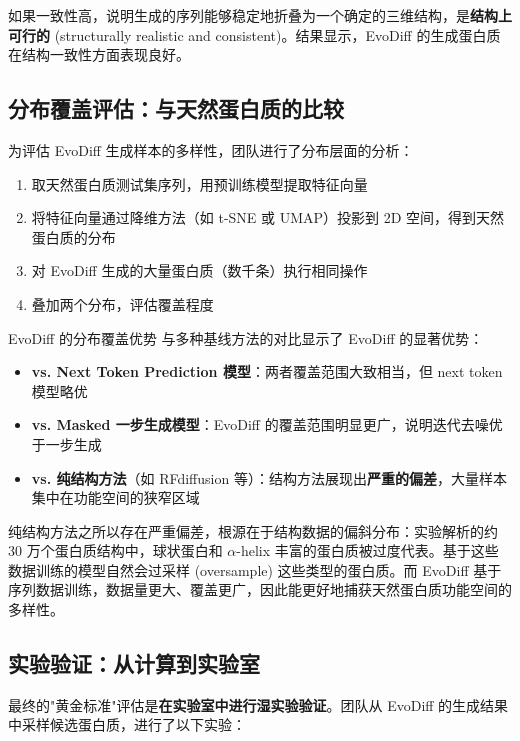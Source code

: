 如果一致性高，说明生成的序列能够稳定地折叠为一个确定的三维结构，是\textbf{结构上可行的} (structurally realistic and consistent)。结果显示，EvoDiff 的生成蛋白质在结构一致性方面表现良好。

\subsection{分布覆盖评估：与天然蛋白质的比较}

为评估 EvoDiff 生成样本的多样性，团队进行了分布层面的分析：

\begin{enumerate}
    \item 取天然蛋白质测试集序列，用预训练模型提取特征向量
    \item 将特征向量通过降维方法（如 t-SNE 或 UMAP）投影到 2D 空间，得到天然蛋白质的分布
    \item 对 EvoDiff 生成的大量蛋白质（数千条）执行相同操作
    \item 叠加两个分布，评估覆盖程度
\end{enumerate}

\begin{importantbox}{EvoDiff 的分布覆盖优势}
与多种基线方法的对比显示了 EvoDiff 的显著优势：
\begin{itemize}
    \item \textbf{vs. Next Token Prediction 模型}：两者覆盖范围大致相当，但 next token 模型略优
    \item \textbf{vs. Masked 一步生成模型}：EvoDiff 的覆盖范围明显更广，说明迭代去噪优于一步生成
    \item \textbf{vs. 纯结构方法}（如 RFdiffusion 等）：结构方法展现出\textbf{严重的偏差}，大量样本集中在功能空间的狭窄区域
\end{itemize}
\end{importantbox}

纯结构方法之所以存在严重偏差，根源在于结构数据的偏斜分布：实验解析的约 30 万个蛋白质结构中，球状蛋白和 $\alpha$-helix 丰富的蛋白质被过度代表。基于这些数据训练的模型自然会过采样 (oversample) 这些类型的蛋白质。而 EvoDiff 基于序列数据训练，数据量更大、覆盖更广，因此能更好地捕获天然蛋白质功能空间的多样性。

\subsection{实验验证：从计算到实验室}

最终的"黄金标准"评估是\textbf{在实验室中进行湿实验验证}。团队从 EvoDiff 的生成结果中采样候选蛋白质，进行了以下实验：

